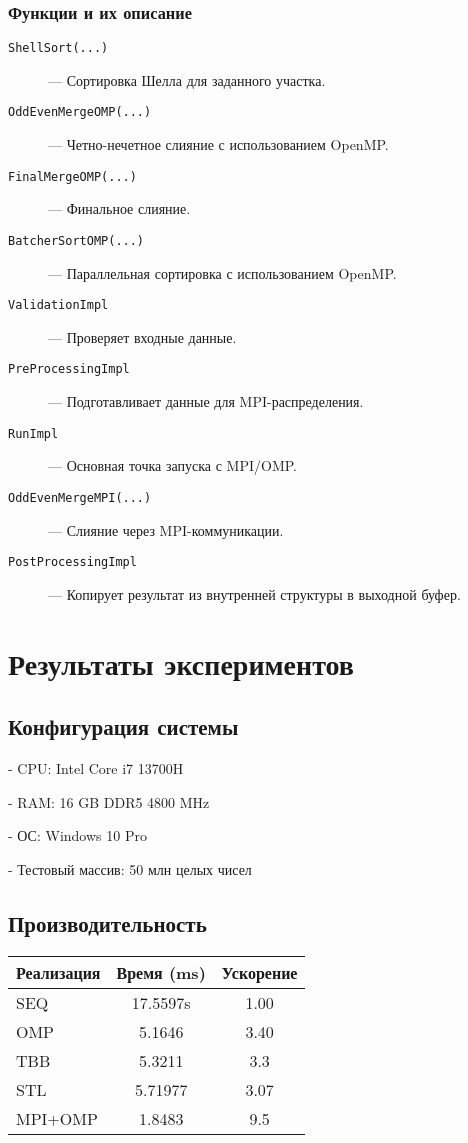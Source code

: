 \documentclass[12pt]{article}
\begin{document}
\subsubsection*{Функции и их описание}
\begin{description}
    \item[\texttt{ShellSort(...)}] — Сортировка Шелла для заданного участка.
    \item[\texttt{OddEvenMergeOMP(...)}] — Четно-нечетное слияние с использованием OpenMP.
    \item[\texttt{FinalMergeOMP(...)}] — Финальное слияние.
    \item[\texttt{BatcherSortOMP(...)}] — Параллельная сортировка с использованием OpenMP.
    \item[\texttt{ValidationImpl}] — Проверяет входные данные.
    \item[\texttt{PreProcessingImpl}] — Подготавливает данные для MPI-распределения.
    \item[\texttt{RunImpl}] — Основная точка запуска с MPI/OMP.
    \item[\texttt{OddEvenMergeMPI(...)}] — Слияние через MPI-коммуникации.
    \item[\texttt{PostProcessingImpl}] — Копирует результат из внутренней структуры в выходной буфер.
\end{description}

\section{Результаты экспериментов}
\subsection*{Конфигурация системы}

    
- CPU: Intel Core i7 13700H
    
- RAM: 16 GB DDR5 4800 MHz
    
- ОС: Windows 10 Pro
    
- Тестовый массив: 50 млн целых чисел


\subsection*{Производительность}
\begin{tabular}{|l|c|c|}
\hline
\textbf{Реализация} & \textbf{Время (ms)} & \textbf{Ускорение} \\
\hline
SEQ       & 17.5597s & 1.00 \\
OMP       & 5.1646 & 3.40 \\
TBB       & 5.3211 & 3.3 \\
STL       & 5.71977 & 3.07 \\
MPI+OMP   & 1.8483 & 9.5 \\
\hline
\end{tabular}
\end{document}
